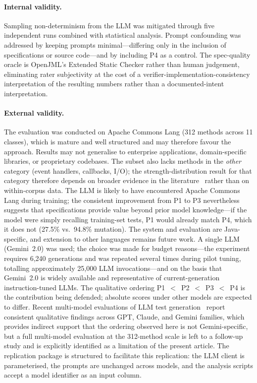 \paragraph{Internal validity.} Sampling non-determinism from the LLM was mitigated through five independent runs combined with statistical analysis. Prompt confounding was addressed by keeping prompts minimal---differing only in the inclusion of specifications or source code---and by including P4 as a control. The spec-quality oracle is OpenJML's Extended Static Checker rather than human judgement, eliminating rater subjectivity at the cost of a verifier-implementation-consistency interpretation of the resulting numbers rather than a documented-intent interpretation.

\paragraph{External validity.} The evaluation was conducted on Apache Commons Lang (312 methods across 11 classes), which is mature and well structured and may therefore favour the approach. Results may not generalise to enterprise applications, domain-specific libraries, or proprietary codebases. The subset also lacks methods in the \emph{other} category (event handlers, callbacks, I/O); the strength-distribution result for that category therefore depends on broader evidence in the literature~\cite{dragan2006reverse} rather than on within-corpus data. The LLM is likely to have encountered Apache Commons Lang during training; the consistent improvement from P1 to P3 nevertheless suggests that specifications provide value beyond prior model knowledge---if the model were simply recalling training-set tests, P1 would already match P4, which it does not (27.5\% vs.\ 94.8\% mutation). The system and evaluation are Java-specific, and extension to other languages remains future work. A single LLM (Gemini~2.0) was used; the choice was made for budget reasons---the experiment requires 6{,}240 generations and was repeated several times during pilot tuning, totalling approximately 25{,}000 LLM invocations---and on the basis that Gemini~2.0 is widely available and representative of current-generation instruction-tuned LLMs. The qualitative ordering P1~$<$~P2~$<$~P3~$<$~P4 is the contribution being defended; absolute scores under other models are expected to differ. Recent multi-model evaluations of LLM test generation~\cite{schafer2023adaptive, yuan2024chattester, molinelli2025oracles} report consistent qualitative findings across GPT, Claude, and Gemini families, which provides indirect support that the ordering observed here is not Gemini-specific, but a full multi-model evaluation at the 312-method scale is left to a follow-up study and is explicitly identified as a limitation of the present article. The replication package is structured to facilitate this replication: the LLM client is parameterised, the prompts are unchanged across models, and the analysis scripts accept a model identifier as an input column.

